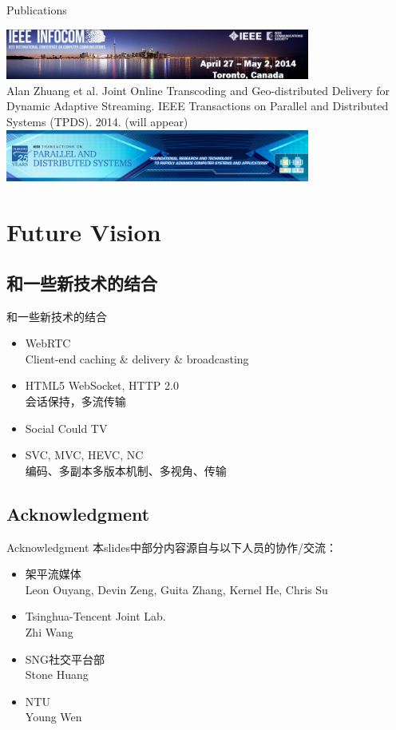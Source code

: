 \documentclass{beamer}
\begin{document}
\begin{frame}{Publications}
\begin{center}
\includegraphics[width=10cm]{fig/infocom.jpg}\\\pause
Alan Zhuang et al. Joint Online Transcoding and Geo-distributed Delivery for Dynamic Adaptive Streaming. IEEE Transactions on Parallel and Distributed Systems (TPDS). 2014. (will appear)\\\pause
\includegraphics[width=10cm]{fig/tpds_25yr.jpg}\\\pause
\end{center}
\end{frame}

\section{Future Vision}
\subsection{和一些新技术的结合}
\begin{frame}{和一些新技术的结合}
\begin{itemize}
\item WebRTC\\
Client-end caching \& delivery \& broadcasting
\item HTML5 WebSocket, HTTP 2.0\\
会话保持，多流传输
\item Social Could TV\\
\item SVC, MVC, HEVC, NC\\
编码、多副本多版本机制、多视角、传输
\end{itemize}
\end{frame}
\subsection{Acknowledgment}
\begin{frame}{Acknowledgment}
本slides中部分内容源自与以下人员的协作/交流：
\begin{itemize}
\item 架平流媒体\\
Leon Ouyang, Devin Zeng, Guita Zhang, Kernel He, Chris Su
\item Tsinghua-Tencent Joint Lab.\\ 
Zhi Wang
\item SNG社交平台部\\
Stone Huang
\item NTU\\
Young Wen
\end{itemize}
\end{frame}
\end{document}
